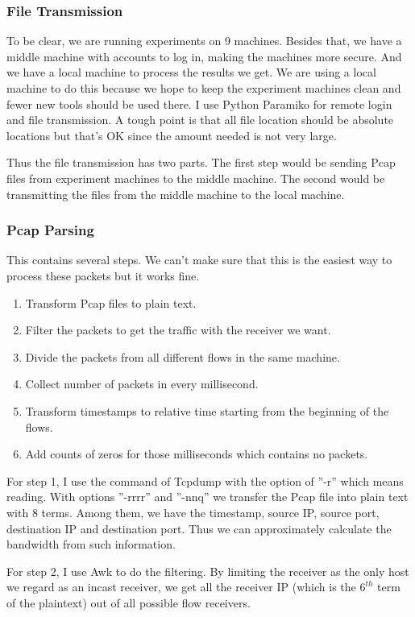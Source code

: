 \documentclass[12pt,a4paper]{article}
\begin{document}
\subsubsection{File Transmission}
To be clear, we are running experiments on 9 machines.
Besides that, we have a middle machine with accounts to log in, making the machines more secure.
And we have a local machine to process the results we get. We are using a local machine to do this because
we hope to keep the experiment machines clean and fewer new tools should be used there.
I use Python Paramiko for remote login and file transmission.
A tough point is that all file location should be absolute locations but that's OK since the amount needed is not very large.

Thus the file transmission has two parts. The first step would be sending Pcap files from experiment machines to the middle machine.
The second would be transmitting the files from the middle machine to the local machine.

\subsubsection{Pcap Parsing}
This contains several steps. We can't make sure that this is the easiest way to process these packets but it works fine.
\begin{enumerate}
	\item Transform Pcap files to plain text.
	\item Filter the packets to get the traffic with the receiver we want.
	\item Divide the packets from all different flows in the same machine.
	\item Collect number of packets in every millisecond.
	\item Transform timestamps to relative time starting from the beginning of the flows.
	\item Add counts of zeros for those milliseconds which contains no packets.
\end{enumerate}

For step 1, I use the command of Tcpdump with the option of ''-r'' which means reading.
With options ''-rrrr'' and ''-nnq'' we transfer the Pcap file into plain text with 8 terms.
Among them, we have the timestamp, source IP, source port, destination IP and destination port.
Thus we can approximately calculate the bandwidth from such information.

For step 2, I use Awk to do the filtering. By limiting the receiver as the only host we regard as an incast receiver, we get all the receiver IP (which is the
$6^{th}$ term of the plaintext) out of all possible flow receivers.
\end{document}
